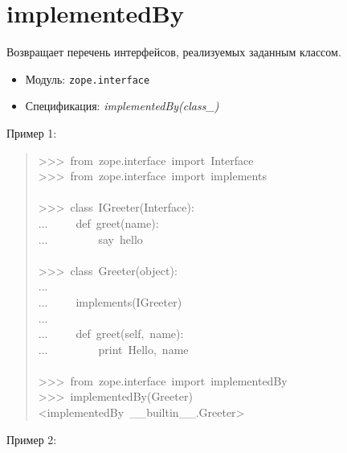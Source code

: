 \documentclass[a4paper,openany,twoside,final]{book}
\providecommand*{\DUroletitlereference}[1]{\textsl{#1}}
\begin{document}
\section*{implementedBy%
  \label{implementedby}%
}

Возвращает перечень интерфейсов, реализуемых заданным классом.

\begin{itemize}

\item Модуль: \texttt{zope.interface}

\item Спецификация: \DUroletitlereference{implementedBy(class\_)}

\end{itemize}

Пример 1:

\begin{quote}{\ttfamily \raggedright \noindent
>{}>{}>~from~zope.interface~import~Interface\\
>{}>{}>~from~zope.interface~import~implements\\
~\\
>{}>{}>~class~IGreeter(Interface):\\
...~~~~~def~greet(name):\\
...~~~~~~~~~\textquotedbl{}say~hello\textquotedbl{}\\
~\\
>{}>{}>~class~Greeter(object):\\
...\\
...~~~~~implements(IGreeter)\\
...\\
...~~~~~def~greet(self,~name):\\
...~~~~~~~~~print~\textquotedbl{}Hello\textquotedbl{},~name\\
~\\
>{}>{}>~from~zope.interface~import~implementedBy\\
>{}>{}>~implementedBy(Greeter)\\
<implementedBy~\_\_builtin\_\_.Greeter>
}
\end{quote}

Пример 2:
\end{document}
